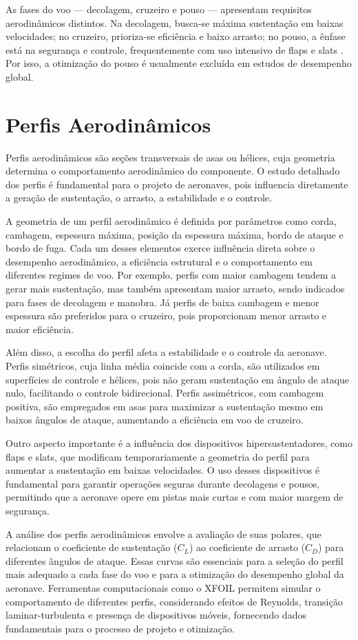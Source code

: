 As fases do voo — decolagem, cruzeiro e pouso — apresentam requisitos aerodinâmicos distintos. Na decolagem, busca-se máxima sustentação em baixas velocidades; no cruzeiro, prioriza-se eficiência e baixo arrasto; no pouso, a ênfase está na segurança e controle, frequentemente com uso intensivo de flaps e slats \cite{raymer2018aircraft}. Por isso, a otimização do pouso é usualmente excluída em estudos de desempenho global.

\section{Perfis Aerodinâmicos}
Perfis aerodinâmicos são seções transversais de asas ou hélices, cuja geometria determina o comportamento aerodinâmico do componente. O estudo detalhado dos perfis é fundamental para o projeto de aeronaves, pois influencia diretamente a geração de sustentação, o arrasto, a estabilidade e o controle.

A geometria de um perfil aerodinâmico é definida por parâmetros como corda, cambagem, espessura máxima, posição da espessura máxima, bordo de ataque e bordo de fuga. Cada um desses elementos exerce influência direta sobre o desempenho aerodinâmico, a eficiência estrutural e o comportamento em diferentes regimes de voo. Por exemplo, perfis com maior cambagem tendem a gerar mais sustentação, mas também apresentam maior arrasto, sendo indicados para fases de decolagem e manobra. Já perfis de baixa cambagem e menor espessura são preferidos para o cruzeiro, pois proporcionam menor arrasto e maior eficiência.

Além disso, a escolha do perfil afeta a estabilidade e o controle da aeronave. Perfis simétricos, cuja linha média coincide com a corda, são utilizados em superfícies de controle e hélices, pois não geram sustentação em ângulo de ataque nulo, facilitando o controle bidirecional. Perfis assimétricos, com cambagem positiva, são empregados em asas para maximizar a sustentação mesmo em baixos ângulos de ataque, aumentando a eficiência em voo de cruzeiro.

Outro aspecto importante é a influência dos dispositivos hipersustentadores, como flaps e slats, que modificam temporariamente a geometria do perfil para aumentar a sustentação em baixas velocidades. O uso desses dispositivos é fundamental para garantir operações seguras durante decolagens e pousos, permitindo que a aeronave opere em pistas mais curtas e com maior margem de segurança.

A análise dos perfis aerodinâmicos envolve a avaliação de suas polares, que relacionam o coeficiente de sustentação (\(C_L\)) ao coeficiente de arrasto (\(C_D\)) para diferentes ângulos de ataque. Essas curvas são essenciais para a seleção do perfil mais adequado a cada fase do voo e para a otimização do desempenho global da aeronave. Ferramentas computacionais como o XFOIL permitem simular o comportamento de diferentes perfis, considerando efeitos de Reynolds, transição laminar-turbulenta e presença de dispositivos móveis, fornecendo dados fundamentais para o processo de projeto e otimização.

